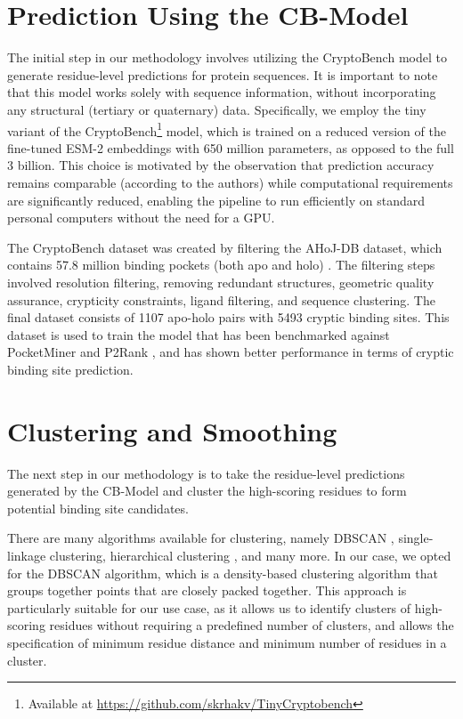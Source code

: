 \section{Prediction Using the CB-Model}
\label{sec:prediction}

The initial step in our methodology involves utilizing the CryptoBench \cite{vskrhak2025cryptobench} model to generate residue-level predictions for protein sequences. It is important to note that this model works solely with sequence information, without incorporating any structural (tertiary or quaternary) data. Specifically, we employ the tiny variant of the CryptoBench\footnote{Available at \url{https://github.com/skrhakv/TinyCryptobench}} model, which is trained on a reduced version of the fine-tuned ESM-2 embeddings \cite{lin2022language} with 650 million parameters, as opposed to the full 3 billion. This choice is motivated by the observation that prediction accuracy remains comparable (according to the authors) while computational requirements are significantly reduced, enabling the pipeline to run efficiently on standard personal computers without the need for a GPU.

The CryptoBench dataset was created by filtering the AHoJ-DB \cite{feidakis2024ahoj} dataset, which contains 57.8 million binding pockets (both apo and holo) \cite{apoholo-stats}. The filtering steps involved resolution filtering, removing redundant structures, geometric quality assurance, crypticity constraints, ligand filtering, and sequence clustering. The final dataset consists of 1107 apo-holo pairs with 5493 cryptic binding sites. This dataset is used to train the model that has been benchmarked against PocketMiner \cite{meller2023predicting} and P2Rank \cite{krivak2018p2rank}, and has shown better performance in terms of cryptic binding site prediction.


\section{Clustering and Smoothing}
\label{sec:clustering}

The next step in our methodology is to take the residue-level predictions generated by the CB-Model and cluster the high-scoring residues to form potential binding site candidates.

There are many algorithms available for clustering, namely DBSCAN \cite{schubert2017dbscan}, single-linkage clustering, hierarchical clustering \cite{jarman2020hierarchical}, and many more. In our case, we opted for the DBSCAN algorithm, which is a density-based clustering algorithm that groups together points that are closely packed together. This approach is particularly suitable for our use case, as it allows us to identify clusters of high-scoring residues without requiring a predefined number of clusters, and allows the specification of minimum residue distance and minimum number of residues in a cluster.

